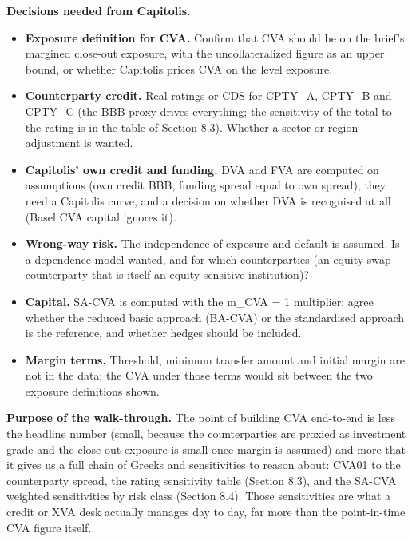 \documentclass[11pt,letterpaper]{article}
\begin{document}
\textbf{Decisions needed from Capitolis.}

\begin{itemize}
\item \textbf{Exposure definition for CVA.} Confirm that CVA should be on the brief's margined close-out exposure, with the uncollateralized figure as an upper bound, or whether Capitolis prices CVA on the level exposure.
\item \textbf{Counterparty credit.} Real ratings or CDS for CPTY\_A, CPTY\_B and CPTY\_C (the BBB proxy drives everything; the sensitivity of the total to the rating is in the table of Section 8.3). Whether a sector or region adjustment is wanted.
\item \textbf{Capitolis' own credit and funding.} DVA and FVA are computed on assumptions (own credit BBB, funding spread equal to own spread); they need a Capitolis curve, and a decision on whether DVA is recognised at all (Basel CVA capital ignores it).
\item \textbf{Wrong-way risk.} The independence of exposure and default is assumed. Is a dependence model wanted, and for which counterparties (an equity swap counterparty that is itself an equity-sensitive institution)?
\item \textbf{Capital.} SA-CVA is computed with the m\_CVA = 1 multiplier; agree whether the reduced basic approach (BA-CVA) or the standardised approach is the reference, and whether hedges should be included.
\item \textbf{Margin terms.} Threshold, minimum transfer amount and initial margin are not in the data; the CVA under those terms would sit between the two exposure definitions shown.
\end{itemize}
\textbf{Purpose of the walk-through.} The point of building CVA end-to-end is less the headline number (small, because the counterparties are proxied as investment grade and the close-out exposure is small once margin is assumed) and more that it gives us a full chain of Greeks and sensitivities to reason about: CVA01 to the counterparty spread, the rating sensitivity table (Section 8.3), and the SA-CVA weighted sensitivities by risk class (Section 8.4). Those sensitivities are what a credit or XVA desk actually manages day to day, far more than the point-in-time CVA figure itself.
\end{document}
